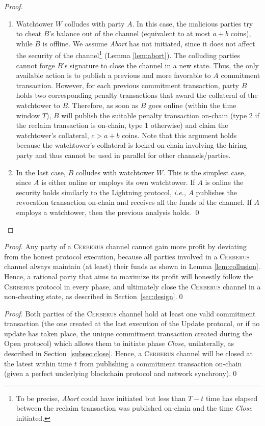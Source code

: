 \documentclass[runningheads]{llncs}
\newcommand{\ie}{{\em i.e.}}
\newcommand{\sys}{\textsc{Cerberus}\xspace}
\begin{document}
\begin{proof}
\begin{enumerate}[label=(\roman*)]
    \item Watchtower $W$ colludes with party $A$.
    In this case, the malicious parties try to cheat $B$'s balance out of the channel (equivalent to at most $a+b$ coins), while $B$ is offline. 
    We assume \textit{Abort} has not initiated, since it does not affect the security of the channel\footnote{To be precise, \textit{Abort} could have initiated but less than $T-t$ time has elapsed between the reclaim transaction was published on-chain and the time \textit{Close} initiated.} (Lemma \ref{lem:abort}).
    The colluding parties cannot forge $B$'s signature to close the channel in a new state. Thus, the only available action is to publish a previous and more favorable to $A$ commitment transaction. 
    However, for each previous commitment transaction, party $B$ holds two corresponding penalty transactions that award the collateral of the watchtower to $B$. Therefore, as soon as $B$ goes online (within the time window $T$), $B$ will publish the suitable penalty transaction on-chain (type 2 if the reclaim transaction is on-chain, type 1 otherwise) and claim the watchtower's collateral, $c>a+b$ coins. 
    Note that this argument holds because the watchtower's collateral is locked on-chain involving the hiring party and thus cannot be used in parallel for other channels/parties.
    
    \item In the last case, $B$ colludes with watchtower $W$.
    This is the simplest case, since $A$ is either online or employs its own watchtower. If $A$ is online the security holds similarly to the Lightning protocol, \ie, $A$ publishes the revocation transaction on-chain and receives all the funds of the channel. If $A$ employs a watchtower, then the previous analysis holds. \hfill \qed
 \end{enumerate}
\end{proof}


\correctness*
\begin{proof}
Any party of a \sys channel cannot gain more profit by deviating from the honest protocol execution, because all parties involved in a \sys channel always maintain (at least) their funds as shown in Lemma \ref{lem:collusion}. Hence, a rational party that aims to maximize its profit will honestly follow the \sys protocol in every phase, and ultimately close the \sys channel in a non-cheating state, as described in Section~\ref{sec:design}.\hfill \qed
\end{proof}

\time*
\begin{proof}
Both parties of the \sys channel hold at least one valid commitment transaction (the one created at the last execution of the Update protocol, or if no update has taken place, the unique commitment transaction created during the Open protocol) which allows them to initiate phase \textit{Close}, unilaterally, as described in Section~\ref{subsec:close}. 
Hence, a \sys channel will be closed at the latest within time $t$ from publishing a commitment transaction on-chain (given a perfect underlying blockchain protocol and network synchrony).\hfill \qed
\end{proof}
\end{document}
